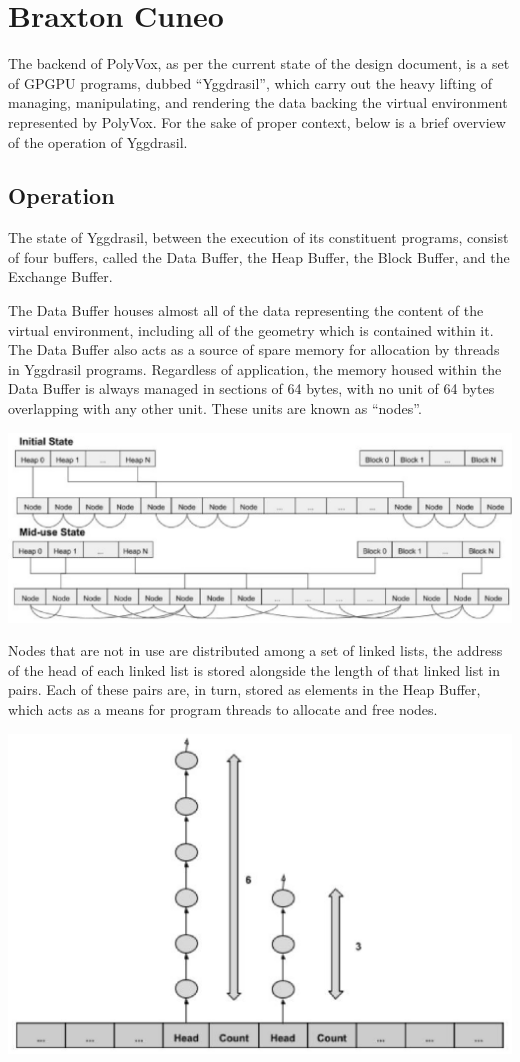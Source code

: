 \documentclass[onecolumn, draftclsnofoot,10pt, compsoc]{IEEEtran}
\begin{document}
\section{Braxton Cuneo}
The backend of PolyVox, as per the current state of the design document, is a set of GPGPU programs, dubbed “Yggdrasil”, which carry out the heavy lifting of managing, manipulating, and rendering the data backing the virtual environment represented by PolyVox. For the sake of proper context, below is a brief overview of the operation of Yggdrasil.

\subsection{Operation}
The state of Yggdrasil, between the execution of its constituent programs, consist of four buffers, called the Data Buffer, the Heap Buffer, the Block Buffer, and the Exchange Buffer.

The Data Buffer houses almost all of the data representing the content of the virtual environment, including all of the geometry which is contained within it. The Data Buffer also acts as a source of spare memory for allocation by threads in Yggdrasil programs. Regardless of application, the memory housed within the Data Buffer is always managed in sections of 64 bytes, with no unit of 64 bytes overlapping with any other unit. These units are known as “nodes”.

\includegraphics{image7}

Nodes that are not in use are distributed among a set of linked lists, the address of the head of each linked list is stored alongside the length of that linked list in pairs. Each of these pairs are, in turn, stored as elements in the Heap Buffer, which acts as a means for program threads to allocate and free nodes.

\includegraphics{image8}
\end{document}
